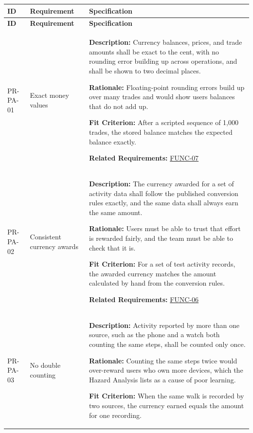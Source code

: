 \documentclass[12pt]{article}
\begin{document}
\small
\setlength{\tabcolsep}{4pt}
\begin{xltabular}{\textwidth}{|p{2.6cm}|p{3.4cm}|X|}
\hline
\textbf{ID} & \textbf{Requirement} & \textbf{Specification} \\
\hline
\endfirsthead
\hline
\textbf{ID} & \textbf{Requirement} & \textbf{Specification} \\
\hline
\endhead

PR-PA-01\hypertarget{req:PR-PA-01}{} &
Exact money values &
\textbf{Description:} Currency balances, prices, and trade amounts shall be exact to the cent, with no rounding error building up across operations, and shall be shown to two decimal places.

\textbf{Rationale:} Floating-point rounding errors build up over many trades and would show users balances that do not add up.

\textbf{Fit Criterion:} After a scripted sequence of 1,000 trades, the stored balance matches the expected balance exactly.

\textbf{Related Requirements:} \hyperlink{req:FUNC-07}{FUNC-07}\\
\hline

PR-PA-02\hypertarget{req:PR-PA-02}{} &
Consistent currency awards &
\textbf{Description:} The currency awarded for a set of activity data shall follow the published conversion rules exactly, and the same data shall always earn the same amount.

\textbf{Rationale:} Users must be able to trust that effort is rewarded fairly, and the team must be able to check that it is.

\textbf{Fit Criterion:} For a set of test activity records, the awarded currency matches the amount calculated by hand from the conversion rules.

\textbf{Related Requirements:} \hyperlink{req:FUNC-06}{FUNC-06}\\
\hline

PR-PA-03\hypertarget{req:PR-PA-03}{} &
No double counting &
\textbf{Description:} Activity reported by more than one source, such as the phone and a watch both counting the same steps, shall be counted only once.

\textbf{Rationale:} Counting the same steps twice would over-reward users who own more devices, which the Hazard Analysis lists as a cause of poor learning.

\textbf{Fit Criterion:} When the same walk is recorded by two sources, the currency earned equals the amount for one recording.


\end{xltabular}
\end{document}
